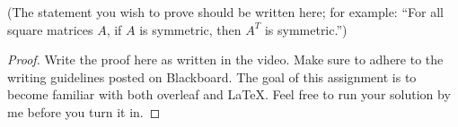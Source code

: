 \documentclass{amsart}
\begin{document}

\begin{prop*}[Screencast 1.2.4] (The statement you wish to prove should be written here; for example: ``For all square matrices $A$, if $A$ is symmetric, then $A^T$ is symmetric.'')
\end{prop*}

\begin{proof} 
Write the proof here as written in the video. Make sure to adhere to the writing guidelines posted on Blackboard. The goal of this assignment is to become familiar with both overleaf and \LaTeX. Feel free to run your solution by me before you turn it in. 
\end{proof}
\end{document}
